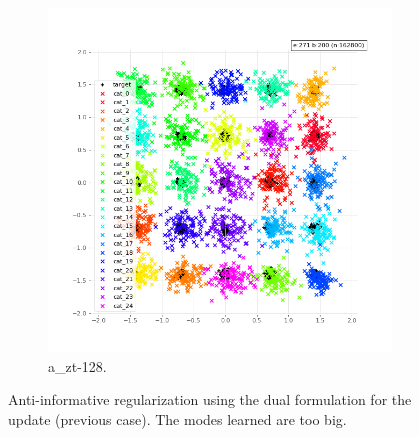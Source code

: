 \begin{figure}[!htbp]
   \centering
\begin{subfigure}[t]{0.48\textwidth}
   \includegraphics[width=\textwidth,center]{2019-05-07/reg-w-dual/a_zt-128.png}
   \caption{a_zt-128.}
   \label{fig:2019-05-07_reg-w-dual-a}
\end{subfigure}
   \caption{Anti-informative regularization using the dual formulation for the update (previous case). The modes learned are too big.}
   \label{fig:2019-05-07_reg-w-dual}
\end{figure}